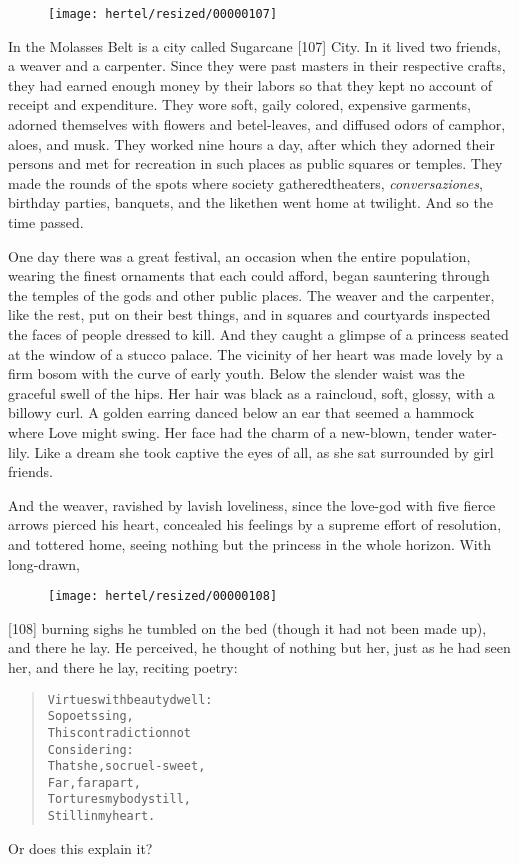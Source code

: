 \documentclass[article, twoside, 10pt]{memoir}
\renewenvironment{verbatim}{%
\begin{quote}%
\vskip -10pt%
\begin{alltt}\normalfont\small}{\end{alltt}%
\end{quote}%
\vskip -10pt
} %
\begin{document}
\begin{figure}[p]\texttt{[image: hertel/resized/00000107]}\end{figure}In the Molasses Belt is a city called Sugarcane [107] City. In it
lived two friends, a weaver and a carpenter. Since they were past
masters in their respective crafts, they had earned enough money by
their labors so that they kept no account of receipt and
expenditure. They wore soft, gaily colored, expensive garments,
adorned themselves with flowers and betel-leaves, and diffused
odors of camphor, aloes, and musk. They worked nine hours a day,
after which they adorned their persons and met for recreation in
such places as public squares or temples. They made the rounds of
the spots where society gathered{\textemdash}theaters, \emph{conversaziones},
birthday parties, banquets, and the like{\textemdash}then went home at
twilight. And so the time passed.

One day there was a great festival, an occasion when the entire
population, wearing the finest ornaments that each could afford,
began sauntering through the temples of the gods and other public
places. The weaver and the carpenter, like the rest, put on their
best things, and in squares and courtyards inspected the faces of
people dressed to kill. And they caught a glimpse of a princess
seated at the window of a stucco palace. The vicinity of her heart
was made lovely by a firm bosom with the curve of early youth.
Below the slender waist was the graceful swell of the hips. Her
hair was black as a raincloud, soft, glossy, with a billowy curl. A
golden earring danced below an ear that seemed a hammock where Love
might swing. Her face had the charm of a new-blown, tender
water-lily. Like a dream she took captive the eyes of all, as she
sat surrounded by girl friends.

And the weaver, ravished by lavish loveliness, since the love-god
with five fierce arrows pierced his heart, concealed his feelings
by a supreme effort of resolution, and tottered home, seeing
nothing but the princess in the whole horizon. With long-drawn,
\begin{figure}[p]\texttt{[image: hertel/resized/00000108]}\end{figure}[108] burning sighs he tumbled on the bed (though it had not been
made up), and there he lay. He perceived, he thought of nothing but
her, just as he had seen her, and there he lay, reciting poetry:

\begin{verbatim}
Virtues with beauty dwell:
    So poets sing,
This contradiction not
    Considering:
That she, so cruel-sweet,
    Far, far apart,
Tortures my body still,
    Still in my heart.
\end{verbatim}
Or does this explain it?
\end{document}
